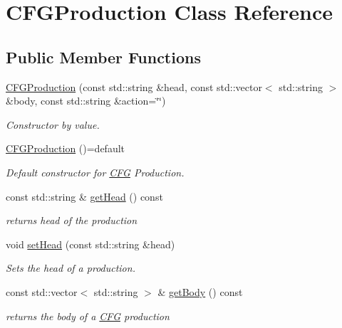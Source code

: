 \hypertarget{classCFGProduction}{}\section{C\+F\+G\+Production Class Reference}
\label{classCFGProduction}
\subsection*{Public Member Functions}
\begin{DoxyCompactItemize}
\item 
\hyperlink{classCFGProduction_ab2fbb6b11310b77bddece142e88d915c}{C\+F\+G\+Production} (const std\+::string \&head, const std\+::vector$<$ std\+::string $>$ \&body, const std\+::string \&action=\char`\"{}\char`\"{})
\begin{DoxyCompactList}\small\item\em Constructor by value. \end{DoxyCompactList}\item 
\mbox{\label{classCFGProduction_a77e4b2d9544c8f4f2658f222bbbc45bf}} 
\hyperlink{classCFGProduction_a77e4b2d9544c8f4f2658f222bbbc45bf}{C\+F\+G\+Production} ()=default
\begin{DoxyCompactList}\small\item\em Default constructor for \hyperlink{classCFG}{C\+FG} Production. \end{DoxyCompactList}\item 
const std\+::string \& \hyperlink{classCFGProduction_a02f373aea381df35d3e889c65a3a5d1a}{get\+Head} () const
\begin{DoxyCompactList}\small\item\em returns head of the production \end{DoxyCompactList}\item 
void \hyperlink{classCFGProduction_a031e16a88f4de0107852494a17a764b1}{set\+Head} (const std\+::string \&head)
\begin{DoxyCompactList}\small\item\em Sets the head of a production. \end{DoxyCompactList}\item 
const std\+::vector$<$ std\+::string $>$ \& \hyperlink{classCFGProduction_a6043cdd8820ea153c073eea0d21c7046}{get\+Body} () const
\begin{DoxyCompactList}\small\item\em returns the body of a \hyperlink{classCFG}{C\+FG} production \end{DoxyCompactList}\item 

\end{DoxyCompactItemize}
